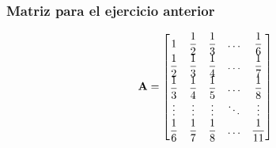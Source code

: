 \documentclass[12pt]{beamer}
\begin{document}
\begin{frame}
\frametitle{Matriz para el ejercicio anterior}
\renewcommand{\arraystretch}{1.5}
\begin{align*}
\vb{A} =
\begin{bmatrix}
1 & \dfrac{1}{2} & \dfrac{1}{3} & \ldots & \dfrac{1}{6} \\
\dfrac{1}{2} & \dfrac{1}{3} & \dfrac{1}{4} & \ldots & \dfrac{1}{7} \\
\dfrac{1}{3} & \dfrac{1}{4} & \dfrac{1}{5} & \ldots & \dfrac{1}{8} \\
\vdots & \vdots & \vdots & \ddots & \vdots \\
\dfrac{1}{6} & \dfrac{1}{7} & \dfrac{1}{8} & \ldots & \dfrac{1}{11}
\end{bmatrix}
\end{align*}
\end{frame}
\end{document}
